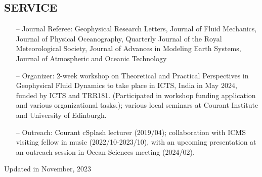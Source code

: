 \documentclass[margin]{res}
\begin{document}
\begin{resume}
\section{{\normalfont SERVICE}}
\begin{itemize}[leftmargin=*,noitemsep]
\item[--]{Journal Referee: Geophysical Research Letters, Journal of Fluid Mechanics, Journal of Physical Oceanography, Quarterly Journal of the Royal Meteorological Society, Journal of Advances in Modeling Earth Systems, Journal of Atmospheric and Oceanic Technology}
\item[--]{Organizer: 2-week workshop on Theoretical and Practical Perspectives in Geophysical Fluid Dynamics to take place in ICTS, India in May 2024, funded by ICTS and TRR181. (Participated in workshop funding application and various organizational tasks.);  various local seminars at Courant Institute and University of Edinburgh.}
\item[--]{Outreach: Courant cSplash lecturer (2019/04); collaboration with ICMS visiting fellow in music (2022/10-2023/10), with an upcoming presentation at an outreach session in Ocean Sciences meeting (2024/02).}
\end{itemize}
\end{resume}


\begin{flushright}
Updated in November, 2023
\end{flushright}

\end{document}
